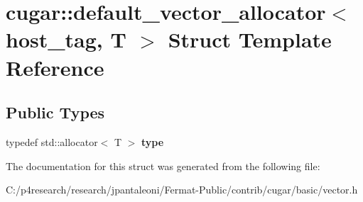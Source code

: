 \hypertarget{structcugar_1_1default__vector__allocator_3_01host__tag_00_01_t_01_4}{}\section{cugar\+:\+:default\+\_\+vector\+\_\+allocator$<$ host\+\_\+tag, T $>$ Struct Template Reference}
\label{structcugar_1_1default__vector__allocator_3_01host__tag_00_01_t_01_4}
\subsection*{Public Types}
\begin{DoxyCompactItemize}
\item 
typedef std\+::allocator$<$ T $>$ {\bfseries type}
\end{DoxyCompactItemize}


The documentation for this struct was generated from the following file\+:\begin{DoxyCompactItemize}
\item 
C\+:/p4research/research/jpantaleoni/\+Fermat-\/\+Public/contrib/cugar/basic/vector.\+h\end{DoxyCompactItemize}
